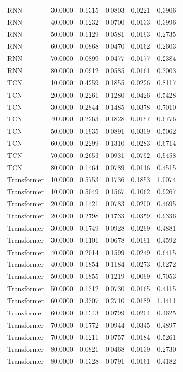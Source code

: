 \begin{tabular}{lrrrrr}
RNN & 30.0000 & 0.1315 & 0.0803 & 0.0221 & 0.3906 \\
RNN & 40.0000 & 0.1232 & 0.0700 & 0.0133 & 0.3996 \\
RNN & 50.0000 & 0.1129 & 0.0581 & 0.0193 & 0.2735 \\
RNN & 60.0000 & 0.0868 & 0.0470 & 0.0162 & 0.2603 \\
RNN & 70.0000 & 0.0899 & 0.0477 & 0.0177 & 0.2384 \\
RNN & 80.0000 & 0.0912 & 0.0585 & 0.0161 & 0.3003 \\
TCN & 10.0000 & 0.4259 & 0.1855 & 0.0226 & 0.8117 \\
TCN & 20.0000 & 0.2261 & 0.1280 & 0.0426 & 0.5428 \\
TCN & 30.0000 & 0.2844 & 0.1485 & 0.0378 & 0.7010 \\
TCN & 40.0000 & 0.2263 & 0.1828 & 0.0157 & 0.6776 \\
TCN & 50.0000 & 0.1935 & 0.0891 & 0.0309 & 0.5062 \\
TCN & 60.0000 & 0.2299 & 0.1310 & 0.0283 & 0.6714 \\
TCN & 70.0000 & 0.2653 & 0.0931 & 0.0792 & 0.5458 \\
TCN & 80.0000 & 0.1464 & 0.0789 & 0.0116 & 0.4515 \\
Transformer & 10.0000 & 0.5753 & 0.1736 & 0.1853 & 1.0074 \\
Transformer & 10.0000 & 0.5049 & 0.1567 & 0.1062 & 0.9267 \\
Transformer & 20.0000 & 0.1421 & 0.0783 & 0.0200 & 0.4695 \\
Transformer & 20.0000 & 0.2798 & 0.1733 & 0.0359 & 0.9336 \\
Transformer & 30.0000 & 0.1749 & 0.0928 & 0.0299 & 0.4881 \\
Transformer & 30.0000 & 0.1101 & 0.0678 & 0.0191 & 0.4592 \\
Transformer & 40.0000 & 0.2014 & 0.1599 & 0.0249 & 0.6415 \\
Transformer & 40.0000 & 0.1854 & 0.1184 & 0.0273 & 0.6272 \\
Transformer & 50.0000 & 0.1855 & 0.1219 & 0.0099 & 0.7053 \\
Transformer & 50.0000 & 0.1312 & 0.0730 & 0.0165 & 0.4115 \\
Transformer & 60.0000 & 0.3307 & 0.2710 & 0.0189 & 1.1411 \\
Transformer & 60.0000 & 0.1343 & 0.0799 & 0.0204 & 0.4625 \\
Transformer & 70.0000 & 0.1772 & 0.0944 & 0.0345 & 0.4897 \\
Transformer & 70.0000 & 0.1211 & 0.0757 & 0.0184 & 0.5261 \\
Transformer & 80.0000 & 0.0821 & 0.0468 & 0.0139 & 0.2730 \\
Transformer & 80.0000 & 0.1328 & 0.0791 & 0.0161 & 0.4182 \\
\bottomrule
\end{tabular}
